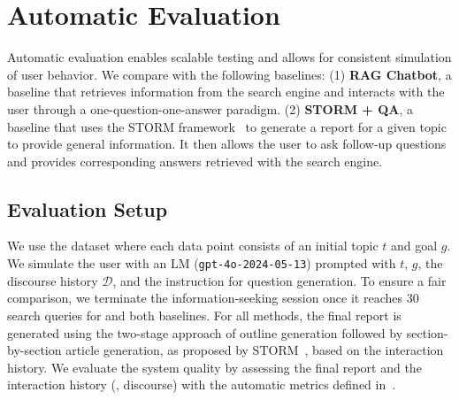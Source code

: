 \documentclass[11pt]{article}
\begin{document}
\section{Automatic Evaluation}
\label{sec:auto_eval}



Automatic evaluation enables scalable testing and allows for consistent simulation of user behavior. We compare \system with the following baselines: (1) \textbf{RAG Chatbot}, a baseline that retrieves information from the search engine and interacts with the user through a one-question-one-answer paradigm. (2) \textbf{STORM + QA}, a baseline that uses the STORM framework~\citep{shao2024assisting} to generate a report for a given topic to provide general information. It then allows the user to ask follow-up questions and provides corresponding answers retrieved with the search engine.

\subsection{Evaluation Setup}
We use the \data dataset where each data point consists of an initial topic $t$ and goal $g$. 
We simulate the user 
with an LM (\texttt{gpt-4o-2024-05-13}) prompted with $t$, $g$, the discourse history $\mathcal{D}$, and the instruction for question generation. To ensure a fair comparison, we terminate the information-seeking session once it reaches 30 search queries for \system and both baselines. For all methods, the final report is generated using the two-stage approach of outline generation followed by section-by-section article generation, as proposed by STORM~\citep{shao2024assisting}, based on the interaction history. We evaluate the system quality by assessing the final report and the interaction history (\ie, discourse) with the automatic metrics defined in~.
\end{document}
